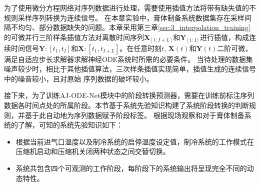 为了使用微分方程网络对序列数据进行处理，需要使用插值方法将带有缺失值的不规则采样序列转换为连续信号。
在本章实验中，膏体制备系统数据集存在采样间隔不均匀、部分数据缺失的问题。本章采用第三章\ref{sec:3_interpolation_training}的可微并行三阶样条插值方法对离散时间序列$\boldsymbol X_{[1:I+L]}$和$\boldsymbol Y_{[1:I]}$进行插值，构成连续时间信号$\boldsymbol Y:[t_1,t_{I}]$和$\boldsymbol X:[t_1,t_{I+L}]$。在任意时刻$t$,  $\boldsymbol X(t)$和$\boldsymbol Y(t)$二阶可微，满足自适应步长求解器求解神经ODE系统时所需的必要条件\cite{kidger2020neural}。
当待处理的数据集噪声较少时，相比于其他插值算法，三次样条插值实现简单，插值生成的连续信号中的噪音较小，且对原始
序列数据的破坏较小。

接下来，为了训练AJ-ODE-Net模块中的阶段转换预测器，需要在训练前标注序列数据各时间点处的所属阶段。本节基于系统先验知识构建了系统阶段转换的判断规则，并基于此自动地为序列数据赋予阶段标签。
根据现场观察和对于膏体制备系统的了解，可知的系统先验知识如下：
\begin{itemize}[nosep]
    \item 根据当前进气口温度以及制冷系统的启停温度设定值，制冷系统的工作模式在压缩机启动和压缩机关闭两种状态之间交替切换。
    \item 系统共包含四个可观测的工作阶段，每阶段下的系统输出将呈现完全不同的动态特性。
\end{itemize}

